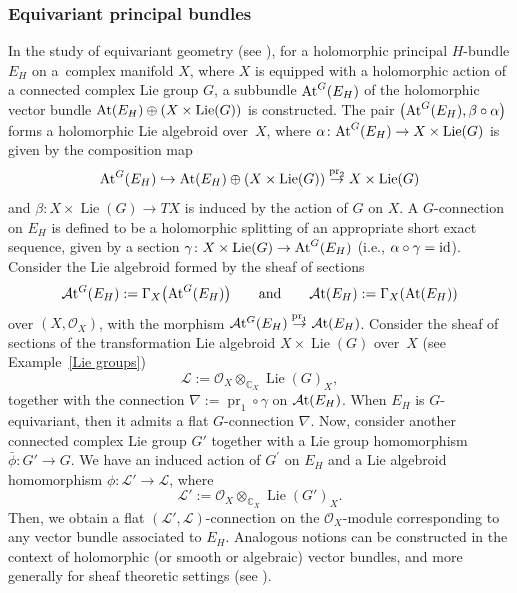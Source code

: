 \documentclass[pdftex]{sigma}
\numberwithin{equation}{section}
\theoremstyle{definition}
\begin{document}
\subsubsection{Equivariant principal bundles}
In the study of equivariant geometry (see \cite{BKN}), for a holomorphic principal $H$-bundle $E_H$ on a~complex manifold $X$, where $X$ is equipped with a holomorphic action of a connected complex Lie group $G$, a subbundle ${\rm At}^G(E_H)$ of the holomorphic vector bundle ${\rm At}(E_H) \oplus (X \times \operatorname{Lie}(G))$ is constructed.
The pair $\bigl({\rm At}^G(E_H), \beta \circ \alpha\bigr)$ forms a holomorphic Lie algebroid over~$X$, where $\alpha\colon {\rm At}^G(E_H) \rightarrow X \times \operatorname{Lie}(G)$ is given by the composition map
\[
{\rm At}^G(E_H) \hookrightarrow {\rm At}(E_H) \oplus (X \times \operatorname{Lie}(G)) \overset{\operatorname{pr}_2}{\rightarrow} X \times \operatorname{Lie}(G)
\]
and $\beta\colon X \times \operatorname{Lie}(G) \rightarrow TX$ is induced by the action of $G$ on $X$. A $G$-connection on $E_H$ is defined to be a holomorphic splitting of an appropriate short exact sequence, given by a section $\gamma\colon X \times \operatorname{Lie}(G) \rightarrow {\rm At}^G(E_H)$ (i.e., $\alpha \circ \gamma= {\rm id}$).
Consider the Lie algebroid formed by the sheaf of sections
\[
\mathcal{A}{\rm t}^G(E_H):= \Gamma_X\bigl({\rm At}^G(E_H)\bigr) \qquad \text{and}\qquad \mathcal{A}{\rm t}(E_H):= \Gamma_X({\rm At}(E_H))
\]
over $(X, \mathcal{O}_X)$, with the morphism $\mathcal{A}{\rm t}^G(E_H) \overset{\operatorname{pr}_1}{\rightarrow}\mathcal{A}{\rm t}(E_H)$. Consider the sheaf of sections of the transformation Lie algebroid $X \times \operatorname{Lie}(G)$ over~$X$ (see Example~\ref{Lie groups})
\[
\mathcal{L}:= \mathcal{O}_X \otimes_{\mathbb{C}_X} \operatorname{Lie}(G)_X,
\]
together with the connection $\nabla:=\operatorname{pr}_1 \circ \gamma$ on $\mathcal{A}{\rm t}(E_H)$.
When $E_H$ is $G$-equivariant, then it admits a flat $G$-connection $\nabla$.
Now, consider another connected complex Lie group $G'$ together with a Lie group homomorphism $\bar{\phi}\colon G' \rightarrow G$. We have an induced action of $G^{\prime}$ on $E_H$ and a Lie algebroid homomorphism $\phi\colon \mathcal{L}' \rightarrow \mathcal{L}$, where
\[
\mathcal{L}':=\mathcal{O}_X \otimes_{\mathbb{C}_X} \operatorname{Lie}(G')_X.
\]
Then, we obtain a flat $(\mathcal{L}', \mathcal{L})$-connection on the $\mathcal{O}_X$-module corresponding to any vector bundle associated to $E_H$. Analogous notions can be constructed in the context of holomorphic (or smooth or algebraic) vector bundles, and more generally for sheaf theoretic settings (see \cite[Section~3.2]{BK-MP}).
\end{document}
